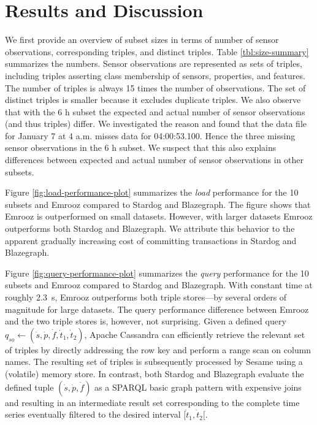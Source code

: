 \documentclass[preprint,12pt,authoryear]{elsarticle}
\begin{document}
\section{Results and Discussion}
\label{s:results-and-discussion}
We first provide an overview of subset sizes in terms of number of sensor observations, corresponding triples, and distinct triples. Table \ref{tbl:size-summary} summarizes the numbers. Sensor observations are represented as sets of triples, including triples asserting class membership of sensors, properties, and features. The number of triples is always 15 times the number of observations. The set of distinct triples is smaller because it excludes duplicate triples. We also observe that with the 6 h subset the expected and actual number of sensor observations (and thus triples) differ. We investigated the reason and found that the data file for January 7 at 4 a.m. misses data for 04:00:53.100. Hence the three missing sensor observations in the 6 h subset. We suspect that this also explains differences between expected and actual number of sensor observations in other subsets.

Figure \ref{fig:load-performance-plot} summarizes the \emph{load} performance for the 10 subsets and Emrooz compared to Stardog and Blazegraph. The figure shows that Emrooz is outperformed on small datasets. However, with larger datasets Emrooz outperforms both Stardog and Blazegraph. We attribute this behavior to the apparent gradually increasing cost of committing transactions in Stardog and Blazegraph.

Figure \ref{fig:query-performance-plot} summarizes the \emph{query} performance for the 10 subsets and Emrooz compared to Stardog and Blazegraph. With constant time at roughly \SI{2.3}{\second}, Emrooz outperforms both triple stores---by several orders of magnitude for large datasets. The query performance difference between Emrooz and the two triple stores is, however, not surprising. Given a defined query $q_{so} \leftarrow (\dot{s},\dot{p},\dot{f},\dot{t}_1,\dot{t}_2)$, Apache Cassandra can efficiently retrieve the relevant set of triples by directly addressing the row key and perform a range scan on column names. The resulting set of triples is subsequently processed by Sesame using a (volatile) memory store. In contrast, both Stardog and Blazegraph evaluate the defined tuple $(\dot{s},\dot{p},\dot{f})$ as a SPARQL basic graph pattern with expensive joins and resulting in an intermediate result set corresponding to the complete time series eventually filtered to the desired interval $[\dot{t}_1,\dot{t}_2[$.
\end{document}
